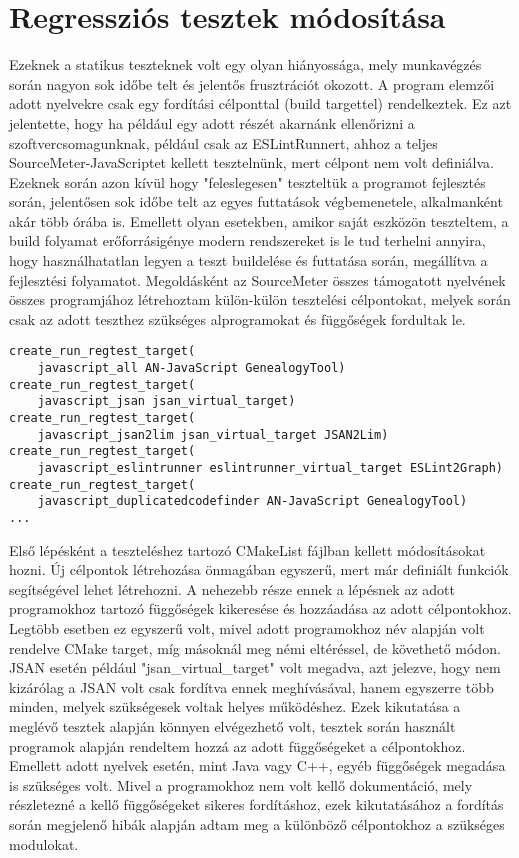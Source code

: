 \section{Regressziós tesztek módosítása}

Ezeknek a statikus teszteknek volt egy olyan hiányossága, mely munkavégzés során nagyon sok időbe telt és jelentős frusztrációt okozott. A program elemzői adott nyelvekre csak egy fordítási célponttal (build targettel) rendelkeztek. Ez azt jelentette, hogy ha például egy adott részét akarnánk ellenőrizni a szoftvercsomagunknak, például csak az ESLintRunnert, ahhoz a teljes SourceMeter-JavaScriptet kellett tesztelnünk, mert célpont nem volt definiálva. Ezeknek során azon kívül hogy "feleslegesen" teszteltük a programot fejlesztés során, jelentősen sok időbe telt az egyes futtatások végbemenetele, alkalmanként akár több órába is. Emellett olyan esetekben, amikor saját eszközön teszteltem, a build folyamat erőforrásigénye modern rendszereket is le tud terhelni annyira, hogy használhatatlan legyen a teszt buildelése és futtatása során, megállítva a fejlesztési folyamatot.
Megoldásként az SourceMeter összes támogatott nyelvének összes programjához létrehoztam külön-külön tesztelési célpontokat, melyek során csak az adott teszthez szükséges alprogramokat és függőségek fordultak le.

\begin{lstlisting}[caption={CMake célpontok JavaScript teszteléshez},label={lst:abs-computedfiltering}, style={CStyle}]
create_run_regtest_target(
    javascript_all AN-JavaScript GenealogyTool)
create_run_regtest_target(
    javascript_jsan jsan_virtual_target)
create_run_regtest_target(
    javascript_jsan2lim jsan_virtual_target JSAN2Lim)
create_run_regtest_target(
    javascript_eslintrunner eslintrunner_virtual_target ESLint2Graph)
create_run_regtest_target(
    javascript_duplicatedcodefinder AN-JavaScript GenealogyTool)
...
\end{lstlisting}
    
Első lépésként a teszteléshez tartozó CMakeList fájlban kellett módosításokat hozni. Új célpontok létrehozása önmagában egyszerű, mert már definiált funkciók segítségével lehet létrehozni. A nehezebb része ennek a lépésnek az adott programokhoz tartozó függőségek kikeresése és hozzáadása az adott célpontokhoz. Legtöbb esetben ez egyszerű volt, mivel adott programokhoz név alapján volt rendelve CMake target, míg másoknál meg némi eltéréssel, de követhető módon. JSAN esetén például "jsan\_virtual\_target" volt megadva, azt jelezve, hogy nem kizárólag a JSAN volt csak fordítva ennek meghívásával, hanem egyszerre több minden, melyek szükségesek voltak helyes működéshez. Ezek kikutatása a meglévő tesztek alapján könnyen elvégezhető volt, tesztek során használt programok alapján rendeltem hozzá az adott függőségeket a célpontokhoz. Emellett adott nyelvek esetén, mint Java vagy C++, egyéb függőségek megadása is szükséges volt. Mivel a programokhoz nem volt kellő dokumentáció, mely részletezné a kellő függőségeket sikeres fordításhoz, ezek kikutatásához a fordítás során megjelenő hibák alapján adtam meg a különböző célpontokhoz a szükséges modulokat. 

